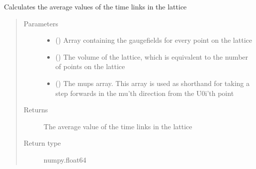 \documentclass[letterpaper,10pt,english]{sphinxmanual}
\begin{document}
\begin{fulllineitems}
\label{\detokenize{index:su2.calcU_t}}
Calculates the average values of the time links in the lattice
\begin{quote}\begin{description}
\item[{Parameters}] \leavevmode\begin{itemize}
\item {} 
 () \textendash{} Array containing the gaugefields for every point on the lattice

\item {} 
 () \textendash{} The volume of the lattice, which is equivalent to the number of
points on the lattice

\item {} 
 () \textendash{} The mups array. This array is used as shorthand for taking a
step forwards in the mu’th direction from the U0i’th point

\end{itemize}

\item[{Returns}] \leavevmode
The average value of the time links in the lattice

\item[{Return type}] \leavevmode
numpy.float64

\end{description}\end{quote}

\end{fulllineitems}

\end{document}
